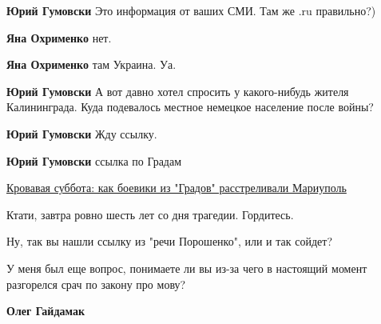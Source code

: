 \begin{itemize}

\textbf{Юрий Гумовски} Это информация от ваших СМИ. Там же .ru правильно?)


\textbf{Яна Охрименко} нет.


\textbf{Яна Охрименко} там Украина. Уа.


\textbf{Юрий Гумовски} А вот давно хотел спросить у какого-нибудь жителя Калининграда. Куда подевалось местное немецкое население после войны?


\textbf{Юрий Гумовски} Жду ссылку.


\textbf{Юрий Гумовски} ссылка по Градам

\href{https://tsn.ua/ru/ukrayina/krovavaya-subbota-kak-boeviki-iz-gradov-rasstrelivali-mariupol-407186.html}{%
Кровавая суббота: как боевики из "Градов" расстреливали Мариуполь}

Ктати, завтра ровно шесть лет со дня трагедии. Гордитесь.



Ну, так вы нашли ссылку из "речи Порошенко", или и так сойдет?

У меня был еще вопрос, понимаете ли вы из-за чего в настоящий момент разгорелся
срач по закону про мову?



\textbf{Олег Гайдамак} 


\end{itemize}
